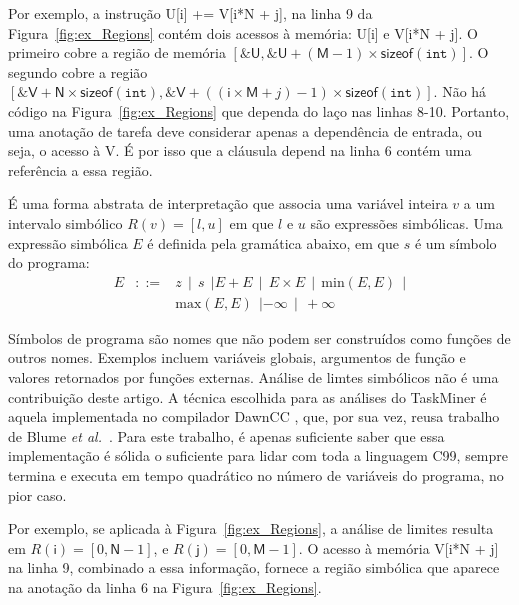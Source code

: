 \documentclass[sigplan,10pt,review]{acmart}
\newcommand\dawn{\mbox{\textsf{DawnCC}}}
\newcommand\Taskminer{\mbox{\textsf{TaskMiner}}}
\begin{document}
 Por exemplo, a instrução \textsf{U[i] += V[i*N + j]}, na linha 9 da Figura~\ref{fig:ex_Regions}
 contém dois acessos à memória: \textsf{U[i]} e
\textsf{V[i*N + j]}.
 O primeiro cobre a região de memória $[\mathtt{\&}\mathsf{U},
\mathtt{\&}\mathsf{U} + (\mathsf{M} - 1) \times \mathsf{sizeof}(\mathtt{int})]$.
O segundo cobre a região 
$[\mathtt{\&}\mathsf{V} + \mathsf{N} \times \mathsf{sizeof}(\mathtt{int}), \mathtt{\&}\mathsf{V} + ((\mathsf{i} \times \mathsf{M} + j) - 1) \times \mathsf{sizeof}(\mathtt{int})]$.
Não há código na Figura~\ref{fig:ex_Regions} que dependa do laço nas linhas 8-10.
Portanto, uma anotação de tarefa deve considerar apenas a dependência de entrada, ou seja,
o acesso à \textsf{V}. É por isso que a cláusula \textsf{depend} na linha 6 contém uma referência
a essa região.

\begin{definition} 
\label{def:limites}
É uma forma abstrata de interpretação que associa uma variável inteira $v$
a um intervalo simbólico $R(v) = [l, u]$ em que $l$ e $u$ são expressões simbólicas.
Uma expressão simbólica $E$ é definida pela gramática abaixo, em que $s$ é um 
símbolo do programa:
\renewcommand{\arraystretch}{0.9}
\[
\begin{array}{rcl}
E & ::= & z \ \ | \ \ s \ \ | E + E \ \ | \ \ E \times E \ \ | \ \  \mbox{min}(E, E) \ \ | \\
&  & \mbox{max}(E, E) \ \ | -\infty \ \ | \ \ +\infty
\end{array}
\]
\end{definition}

Símbolos de programa são nomes que não podem ser construídos como funções de
outros nomes. Exemplos incluem variáveis globais, argumentos de função e valores retornados
por funções externas. Análise de limtes simbólicos não é uma contribuição deste artigo. A técnica
escolhida para as análises do {\Taskminer} é aquela implementada no compilador \dawn{} \cite{Mendonca17},
que, por sua vez, reusa trabalho de Blume {\em et al.}~\cite{Blume94}. Para este trabalho, é apenas
suficiente saber que essa implementação é sólida o suficiente para lidar com toda a linguagem C99, sempre termina
e executa em tempo quadrático no número de variáveis do programa, no pior caso.

Por exemplo, se aplicada à Figura~\ref{fig:ex_Regions}, a análise de limites resulta em 
$R(\mathsf{i}) = [0, \mathsf{N} - 1]$, e $R(\mathsf{j}) = [0, \mathsf{M} - 1]$.
O acesso à memória \textsf{V[i*N + j]} na linha 9, combinado a essa informação, fornece
a região simbólica que aparece na anotação da linha 6 na Figura~\ref{fig:ex_Regions}.
\end{document}
